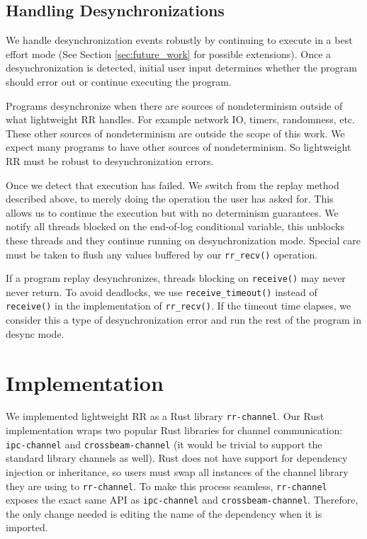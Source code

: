\subsection{Handling Desynchronizations}
\label{sec:handle_desync}
We handle desynchronization events robustly by continuing to execute in
a best effort mode (See Section \ref{sec:future_work} for possible extensions).
Once a desynchronization is detected, initial user input determines whether the
program should error out or continue executing the program.

Programs desynchronize when there are sources of nondeterminism outside of what lightweight
RR handles. For example network IO, timers, randomness, etc. These
other sources of nondeterminism are outside the scope of this work. We expect many
programs to have other sources of nondeterminism. So lightweight RR must be robust to
desynchronization errors.

Once we detect that execution has failed. We switch from the replay method described
above, to merely doing the operation the user has asked for. This allows us to
continue the execution but with no determinism guarantees. We notify all threads
blocked on the end-of-log conditional variable, this unblocks these threads and
they continue running on desynchronization mode. Special care must be taken to
flush any values buffered by our \texttt{rr\_recv()} operation.

If a program replay desynchronizes, threads blocking on \texttt{receive()} may never never
return. To avoid deadlocks, we use \texttt{receive\_timeout()} instead of \texttt{receive()}
in the implementation of \texttt{rr\_recv()}. If the timeout time elapses, we consider this
a type of desynchronization error and run the rest of the program in desync mode.

\section{Implementation}
We implemented lightweight RR as a Rust library \texttt{rr-channel}. Our Rust implementation
wraps two popular Rust libraries
for channel communication: \texttt{ipc-channel} and \texttt{crossbeam-channel} (it would be
trivial to support the standard library channels as well). Rust does not have
support for dependency injection or inheritance, so users must swap all instances of the
channel library they are using to \texttt{rr-channel}. To make this process seamless,
\texttt{rr-channel} exposes the exact same API as \texttt{ipc-channel} and
\texttt{crossbeam-channel}. Therefore, the only change needed is editing the name of the
dependency when it is imported.

